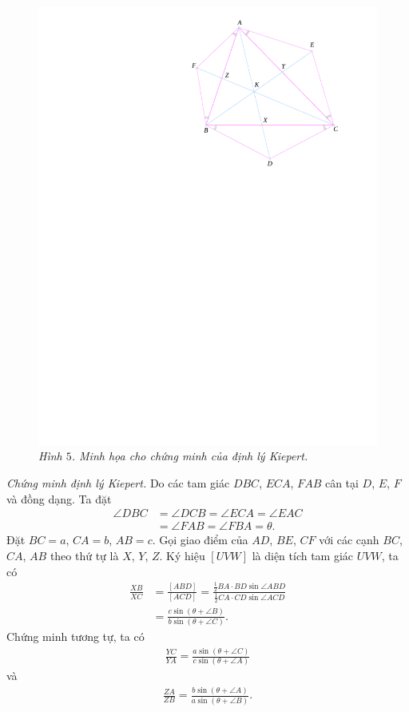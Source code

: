 \begin{multicols}{2}
\begin{figure}[H]
		\includegraphics[width= 0.75\linewidth]{figure8056a}
		\caption{\small\textit{\color{cackithi}Hình $5$. Minh họa cho chứng minh của định lý Kiepert.}}
		\vspace*{-10pt}
	\end{figure}
	\textit{Chứng minh định lý Kiepert.} Do các tam giác $DBC$, $ECA$, $FAB$ cân tại $D$, $E$, $F$ và đồng dạng. Ta đặt
		\begin{align*}
			\angle DBC&=\angle DCB=\angle ECA=\angle EAC\\
			&=\angle FAB=\angle FBA=\theta.
		\end{align*}
		Đặt $BC=a$, $CA=b$, $AB=c$. Gọi giao điểm của $AD$, $BE$, $CF$ với các cạnh $BC$, $CA$, $AB$ theo thứ tự là $X$, $Y$, $Z$. Ký hiệu $[UVW]$ là diện tích tam giác $UVW$, ta có
		\begin{align*}
			\frac{XB}{XC}&=\frac{[ABD]}{[ACD]}=\frac{\frac{1}{2}BA\cdot BD\sin\angle ABD}{\frac{1}{2}CA\cdot CD\sin\angle ACD}\\
			&=\frac{c\sin(\theta+\angle B)}{b\sin(\theta+\angle C)}. \tag{$1$}
		\end{align*}
		Chứng minh tương tự, ta có
		\begin{align*}\frac{YC}{YA}=\frac{a\sin(\theta+\angle C)}{c\sin(\theta+\angle A)}\tag{$2$}
		\end{align*}
		và
		\begin{align*}\label{eq3}\frac{ZA}{ZB}=\frac{b\sin(\theta+\angle A)}{a\sin(\theta+\angle B)}.\tag{$3$}

\end{align*}
\end{multicols}
